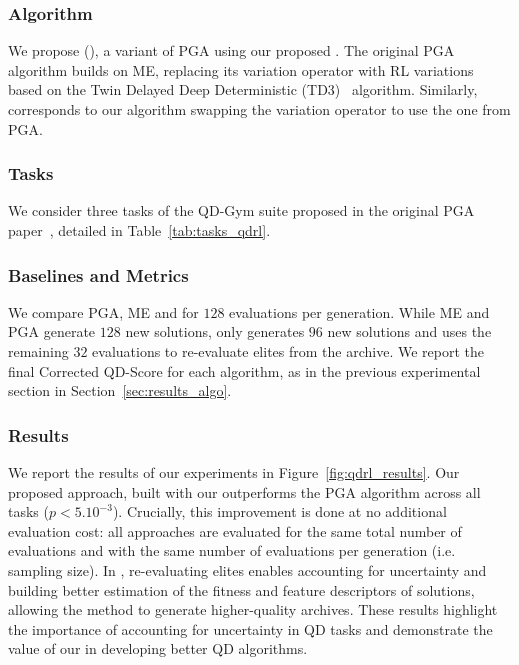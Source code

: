 \subsubsection{Algorithm} 
We propose \Longnamepga{} (\namepga{}), a variant of PGA using our proposed \framework{}. 
The original PGA algorithm builds on ME, replacing its variation operator with RL variations based on the Twin Delayed Deep Deterministic (TD3)~\cite{fujimoto2018addressing} algorithm. Similarly, \namepga{} corresponds to our \name{} algorithm swapping the variation operator to use the one from PGA.


\subsubsection{Tasks}
We consider three tasks of the QD-Gym suite proposed in the original PGA paper~\cite{nilsson2021policy}, detailed in Table~\ref{tab:tasks_qdrl}.



\subsubsection{Baselines and Metrics}
We compare PGA, ME and \namepga{} for $128$ evaluations per generation. While ME and PGA generate $128$ new solutions, \namepga{} only generates $96$ new solutions and uses the remaining $32$ evaluations to re-evaluate elites from the archive. 
We report the final Corrected QD-Score for each algorithm, as in the previous experimental section in Section~\ref{sec:results_algo}. 

\subsubsection{Results}

We report the results of our experiments in Figure~\ref{fig:qdrl_results}. 
Our proposed \namepga{} approach, built with our \framework{} outperforms the PGA algorithm across all tasks ($p<5.10^{-3}$). 
Crucially, this improvement is done at no additional evaluation cost: all approaches are evaluated for the same total number of evaluations and with the same number of evaluations per generation (i.e. sampling size). 
In \namepga{}, re-evaluating elites enables accounting for uncertainty and building better estimation of the fitness and feature descriptors of solutions, allowing the method to generate higher-quality archives. These results highlight the importance of accounting for uncertainty in QD tasks and demonstrate the value of our \framework{} in developing better QD algorithms. 



